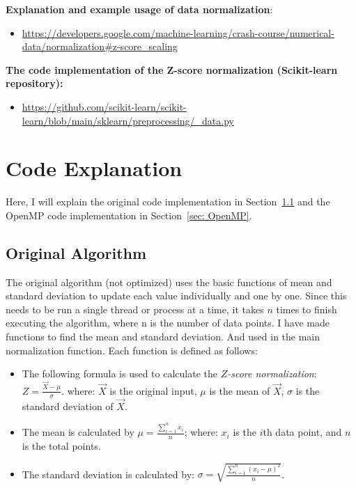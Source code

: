 \documentclass{article}
\newcommand{\zonenorm}{\textit{$Z$-score normalization}}
\begin{document}
\textbf{Explanation and example usage of data normalization}: 
\begin{itemize}  \item \url{https://developers.google.com/machine-learning/crash-course/numerical-data/normalization#z-score_scaling} \end{itemize}
\textbf{The code implementation of the Z-score normalization (Scikit-learn repository):}
\begin{itemize}  \item \url{https://github.com/scikit-learn/scikit-learn/blob/main/sklearn/preprocessing/_data.py} \end{itemize}


\section{Code Explanation} \label{sec:code}


Here, I will explain the original code implementation in Section~\ref{sec: original} and the OpenMP code implementation in Section~\ref{sec: OpenMP}. 

\subsection{Original Algorithm}\label{sec: original}
The original algorithm (not optimized) uses the basic functions of mean and standard deviation to update each value individually and one by one.
% 
Since this needs to be run a single thread or process at a time, it takes $n$ times to finish executing the algorithm, where n is the number of data points. 
% 
I have made functions to find the mean and standard deviation.  
And used in the main normalization function. 
Each function is defined as follows:

\begin{itemize}
    \item The following formula is used to calculate the \zonenorm{}: $Z = \frac{\vec{X} - \mu}{\sigma}$. where: $\vec{X}$ is the original input,  $\mu$ is the mean of $\vec{X}$, $\sigma$ is the standard deviation of $\vec{X}$.
    \item The mean is calculated by  $\mu = \frac{\sum_{i=1}^{n} x_i}{n}$; where: $x_i$ is the $i$th data point, and $n$ is the total points.
    \item The standard deviation is calculated by: $\sigma = \sqrt{\frac{\sum_{i=1}^{n} (x_i - \mu)^2}{n}}$.
\end{itemize}
\end{document}
